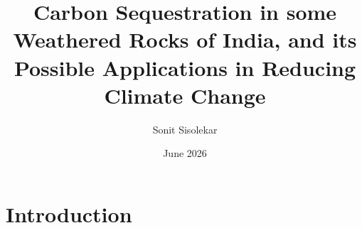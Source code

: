 \documentclass{article}
\title{Carbon Sequestration in some Weathered Rocks of India, and its Possible Applications in Reducing Climate Change}
\author{Sonit Sisolekar}
\date{June 2026}
\begin{document}
\maketitle

\section{Introduction}
\end{document}
